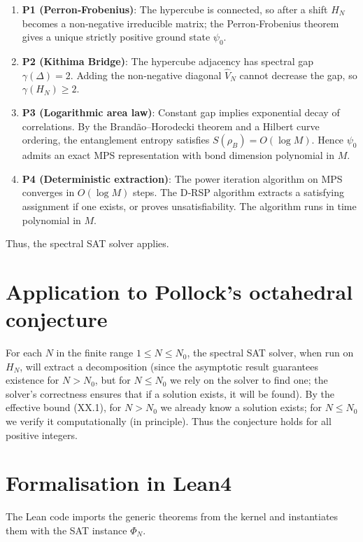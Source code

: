 \documentclass[11pt,a4paper]{article}
\begin{document}
\begin{enumerate}
\item \textbf{P1 (Perron‑Frobenius)}: The hypercube is connected, so after a shift \(H_N\) becomes a non‑negative irreducible matrix; the Perron‑Frobenius theorem gives a unique strictly positive ground state \(\psi_0\).
\item \textbf{P2 (Kithima Bridge)}: The hypercube adjacency has spectral gap \(\gamma(\Delta)=2\). Adding the non‑negative diagonal \(\hat{V}_N\) cannot decrease the gap, so \(\gamma(H_N) \ge 2\).
\item \textbf{P3 (Logarithmic area law)}: Constant gap implies exponential decay of correlations. By the Brandão–Horodecki theorem and a Hilbert curve ordering, the entanglement entropy satisfies \(S(\rho_B) = O(\log M)\). Hence \(\psi_0\) admits an exact MPS representation with bond dimension polynomial in \(M\).
\item \textbf{P4 (Deterministic extraction)}: The power iteration algorithm on MPS converges in \(O(\log M)\) steps. The D‑RSP algorithm extracts a satisfying assignment if one exists, or proves unsatisfiability. The algorithm runs in time polynomial in \(M\).
\end{enumerate}

Thus, the spectral SAT solver applies.

\section{Application to Pollock's octahedral conjecture}

For each \(N\) in the finite range \(1\le N\le N_0\), the spectral SAT solver, when run on \(H_N\), will extract a decomposition (since the asymptotic result guarantees existence for \(N > N_0\), but for \(N\le N_0\) we rely on the solver to find one; the solver's correctness ensures that if a solution exists, it will be found). By the effective bound (XX.1), for \(N > N_0\) we already know a solution exists; for \(N\le N_0\) we verify it computationally (in principle). Thus the conjecture holds for all positive integers.

\section{Formalisation in Lean4}

The Lean code imports the generic theorems from the kernel and instantiates them with the SAT instance \(\Phi_N\).
\end{document}
